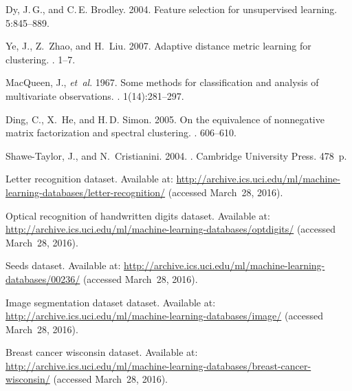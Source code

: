 \documentclass[12pt,twoside]{article}
\begin{document}
\begin{thebibliography}{10}
Dy, J.\,G.,  and C.\,E. Brodley.
2004. Feature selection for unsupervised learning.
 5:845--889.

Ye, J., Z.~Zhao,  and H.~Liu.
2007. Adaptive distance metric learning for clustering.
. 1--7.

MacQueen, J., \textit{et~al}.
1967. Some methods for classification and analysis of multivariate observations.
. 1(14):281--297.

Ding, C., X.~He,  and H.\,D. Simon.
2005. On the equivalence of nonnegative matrix factorization and spectral clustering.
. 606--610.

Shawe-Taylor, J.,  and N.~Cristianini.
2004.
.
Cambridge University Press. 478~p.

Letter recognition dataset.
Available at:
  \url{http://archive.ics.uci.edu/ml/machine-learning-databases/letter-recognition/}
(accessed March~28, 2016).

Optical recognition of handwritten digits dataset.
Available at:
  \url{http://archive.ics.uci.edu/ml/machine-learning-databases/optdigits/}
(accessed March~28, 2016).

Seeds dataset.
Available at:
  \url{http://archive.ics.uci.edu/ml/machine-learning-databases/00236/}
(accessed March~28, 2016).

Image segmentation dataset dataset.
Available at:
  \url{http://archive.ics.uci.edu/ml/machine-learning-databases/image/}
(accessed March~28, 2016).

Breast cancer wisconsin dataset.
Available at:
  \url{http://archive.ics.uci.edu/ml/machine-learning-databases/breast-cancer-wisconsin/}
(accessed March~28, 2016).

\end{thebibliography}
\end{document}
